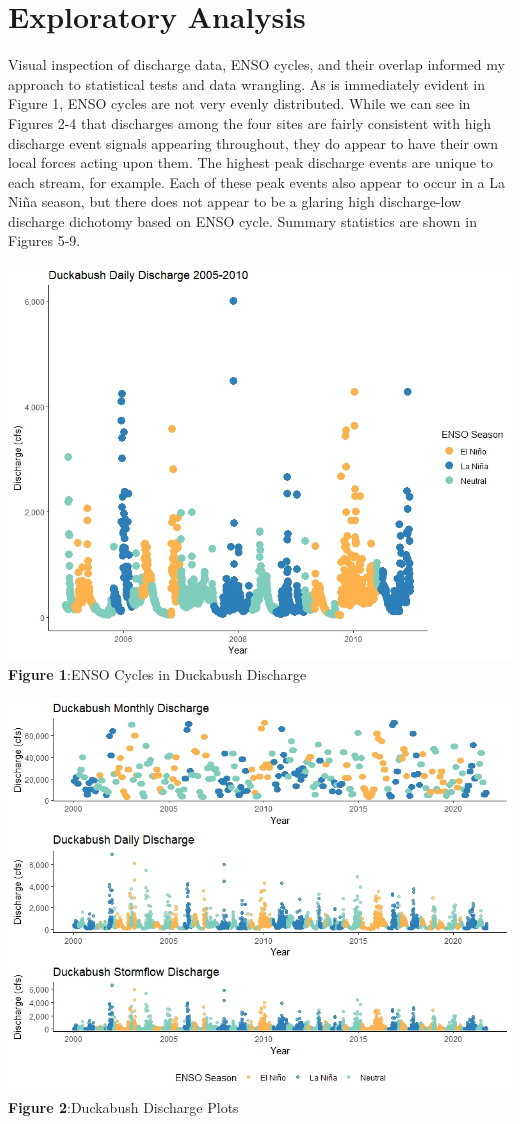 \documentclass[
  12pt,
]{article}
\begin{document}
\newpage

\hypertarget{exploratory-analysis}{%
\section{Exploratory Analysis}\label{exploratory-analysis}}

Visual inspection of discharge data, ENSO cycles, and their overlap
informed my approach to statistical tests and data wrangling. As is
immediately evident in Figure 1, ENSO cycles are not very evenly
distributed. While we can see in Figures 2-4 that discharges among the
four sites are fairly consistent with high discharge event signals
appearing throughout, they do appear to have their own local forces
acting upon them. The highest peak discharge events are unique to each
stream, for example. Each of these peak events also appear to occur in a
La Niña season, but there does not appear to be a glaring high
discharge-low discharge dichotomy based on ENSO cycle. Summary
statistics are shown in Figures 5-9.

\includegraphics{Data/Processed/ExampleDischarge.jpeg} \textbf{Figure
1}:ENSO Cycles in Duckabush Discharge

\includegraphics{Data/Processed/Plots/DuckPlots.jpeg} \textbf{Figure
2}:Duckabush Discharge Plots
\end{document}
